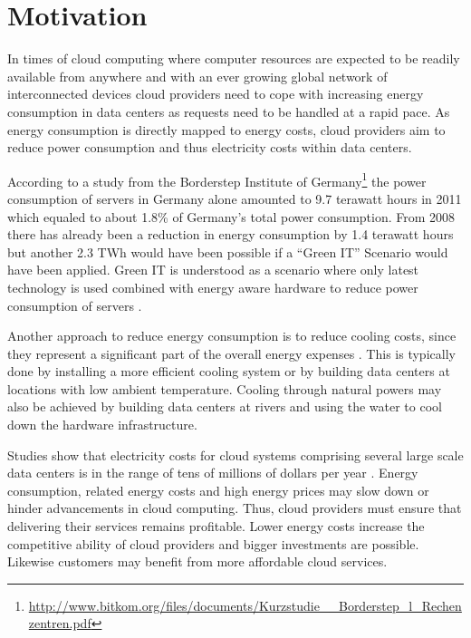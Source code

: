 

\section{Motivation}

In times of cloud computing where computer resources are expected to be readily available from anywhere \cite{buyya2009cloud} and with an ever growing global network of interconnected devices cloud providers need to cope with increasing energy consumption in data centers as requests need to be handled at a rapid pace. 
As energy consumption is directly mapped to energy costs, cloud providers aim to reduce power consumption and thus electricity costs within data centers. 

According to a study from the Borderstep Institute of Germany\footnote{\url{http://www.bitkom.org/files/documents/Kurzstudie__Borderstep_l_Rechenzentren.pdf}} the power consumption of servers in Germany alone amounted to 9.7 terawatt hours in 2011 which equaled to about 1.8\% of Germany's total power consumption. From 2008 there has already been a reduction in energy consumption by 1.4 terawatt hours but another 2.3 TWh would have been possible if a "`Green IT"' Scenario would have been applied. Green IT is understood as a scenario where only latest technology is used combined with energy aware hardware to reduce power consumption of servers \cite{liu2009greencloud}. 

Another approach to reduce energy consumption is to reduce cooling costs, since they represent a significant part of the overall energy expenses \cite{patterson2008effect}. This is typically done by installing a more efficient cooling system or by building data centers at locations with low ambient temperature. Cooling through natural powers may also be achieved by building data centers at rivers and using the water to cool down the hardware infrastructure. 

Studies show that electricity costs for cloud systems comprising several large scale data centers is in the range of tens of millions of dollars per year \cite{qureshi2009cutting}. Energy consumption, related energy costs and high energy prices may slow down or hinder advancements in cloud computing. Thus, cloud providers must ensure that delivering their services remains profitable. Lower energy costs increase the competitive ability of cloud providers and bigger investments are possible. Likewise customers may benefit from more affordable cloud services. 

